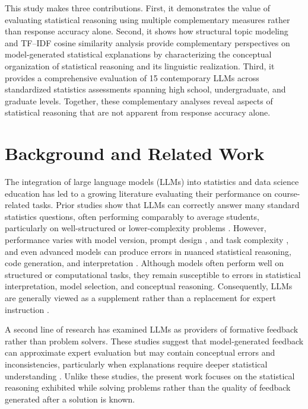 \documentclass[APA,LATO2COL]{WileyNJDv5}
\begin{document}
This study makes three contributions. First, it demonstrates the value of evaluating statistical reasoning using multiple complementary measures rather than response accuracy alone. Second, it shows how structural topic modeling and TF–IDF cosine similarity analysis provide complementary perspectives on model-generated statistical explanations by characterizing the conceptual organization of statistical reasoning and its linguistic realization. Third, it provides a comprehensive evaluation of 15 contemporary LLMs across standardized statistics assessments spanning high school, undergraduate, and graduate levels. Together, these complementary analyses reveal aspects of statistical reasoning that are not apparent from response accuracy alone.


\section{Background and Related Work}\label{sec:background}

The integration of large language models (LLMs) into statistics and data science education has led to a growing literature evaluating their performance on course-related tasks. Prior studies show that LLMs can correctly answer many standard statistics questions, often performing comparably to average students, particularly on well-structured or lower-complexity problems \cite{mcgeesadler2025, ellis23, williams2024}. However, performance varies with model version, prompt design  \cite{yao2024}, and task complexity \cite{ruta2025}, and even advanced models can produce errors in nuanced statistical reasoning, code generation, and interpretation \cite{herklotz2025trustllmstutorstudents}. Although models often perform well on structured or computational tasks, they remain susceptible to errors in statistical interpretation, model selection, and conceptual reasoning.  Consequently, LLMs are generally viewed as a supplement rather than a replacement for expert instruction \cite{mcgeesadler2025, ellis23}.

A second line of research has examined LLMs as providers of formative feedback rather than problem solvers. These studies suggest that model-generated feedback can approximate expert evaluation but may contain conceptual errors and inconsistencies, particularly when explanations require deeper statistical understanding \cite{herklotz2025trustllmstutorstudents, schwarz2025}. Unlike these studies, the present work focuses on the statistical reasoning exhibited while solving problems rather than the quality of feedback generated after a solution is known.
\end{document}
